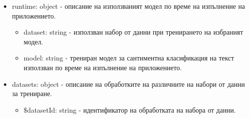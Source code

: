 \documentclass{article}
\begin{document}
    \begin{itemize}

        \item runtime: object - описание на използваният модел по време на изпълнение на приложението.

        \begin{itemize}

            \item dataset: string - използван набор от данни при тренирането на избраният модел.
            \item model: string - трениран модел за сантиментна класификация на текст използван по време на изпълнение на
            приложението.

        \end{itemize}

        \item datasets: object - описание на обработките на различните на набори от данни за трениране.

        \begin{itemize}

            \item \$datasetId: string - идентификатор на обработката на набора от данни.

            \begin{itemize}


\end{itemize}
\end{itemize}
\end{itemize}
\end{document}
